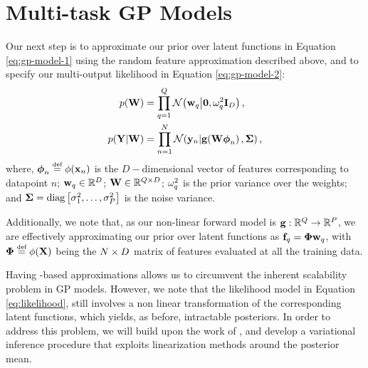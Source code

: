 \section{Multi-task GP Models}
 Our next step is to approximate our prior over latent functions in Equation \eqref{eq:gp-model-1} 
 using the random feature approximation described above, and to specify 
 our multi-output likelihood in Equation \eqref{eq:gp-model-2}:
 \begin{align}
 \label{eq:prior}
 p(\mathbf{W}) &=  \prod^Q_{q=1} \mathcal{N}\!\left({\mathbf{w}_q}\middle\vert{\mathbf{0}, \ensuremath{\omega^2}_q \ensuremath{\mathbf{I}_{D}}}\right) \text{,} \\
  \label{eq:likelihood}
    p\!\left({\mathbf{Y} }\middle\vert{\ensuremath{\mathbf{W}}}\right) &=
        \prod^N_{n=1} \mathcal{N}\!\left({\mathbf{y}_n}\middle\vert{\ensuremath{\mathbf{g}\!\left({{\mathbf{W}\boldsymbol\phi_n}}\right)}, \ensuremath{\mathbf{\Sigma}}}\right)  \text{,}
\end{align}
%
where,  $\feats_n \defeq \featfunc{\ins_n}$  is the 
 $D-$dimensional vector of features corresponding to datapoint $n$; 
$\mathbf{w}_q \in \mathbb{R}^{D}$;
 $\mathbf{W} \in \mathbb{R}^{Q   \times D}$;
$\omega^2_q$ is the prior variance over the weights; 
 and $\mathbf{\Sigma} = \operatorname{diag}{\left[{\sigma^2_1, \ldots, \sigma^2_P}\right]}$ is the  
 noise variance. 
 
Additionally, we note that, as our non-linear
forward model  is $\mathbf{g} : \mathbb{R}^{Q} \to \mathbb{R}^{P}$,  
we are effectively  approximating our prior over latent functions as 
 $\mathbf{f}_q = \boldsymbol\Phi\mathbf{w}_q$, with  $\Feats \defeq \featfunc{\Ins}$
 being the $N \times D$  matrix of features evaluated at all the training data. 
 
Having \rks-based approximations allows us to circumvent the inherent
scalability problem in GP models. However, we note that the likelihood model 
in Equation  \eqref{eq:likelihood}, still involves a non linear transformation 
of the corresponding latent functions, which yields, as before, intractable posteriors. 
In order to address this problem, we will build upon the work of 
\citet{steinberg-bonilla-nips-2014}, and develop a variational inference procedure 
that exploits linearization methods around the posterior mean.



 










































